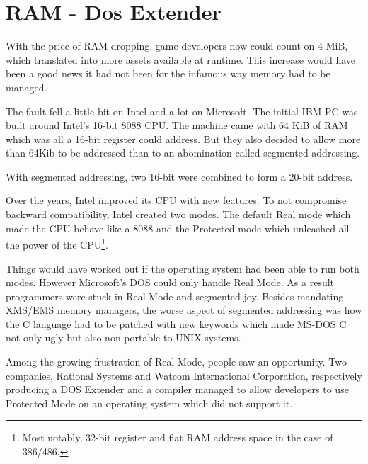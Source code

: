 \section{RAM - Dos Extender}
With the price of RAM dropping, game developers now could count on 4 MiB, which translated into more assets available at runtime. This increase would have been a good news it had not been for the infamous way memory had to be managed.\\
\par
The fault fell a little bit on Intel and a lot on Microsoft. The initial IBM PC was built around Intel's 16-bit 8088 CPU. The machine came with 64 KiB of RAM which was all a 16-bit register could address. But they also decided to allow more than 64Kib to be addressed than to an abomination called segmented addressing.\\
\par
With segmented addressing, two 16-bit were combined to form a 20-bit address.\\
\par


\par
Over the years, Intel improved its CPU with new features. To not compromise backward compatibility, Intel created two modes. The default Real mode which made the CPU behave like a 8088 and the Protected mode which unleashed all the power of the CPU\footnote{Most notably, 32-bit register and flat RAM address space in the case of 386/486.}.\\
\par
Things would have worked out if the operating system had been able to run both modes. However Microsoft's DOS could only handle Real Mode. As a result programmers were stuck in Real-Mode and segmented joy. Besides mandating XMS/EMS memory managers, the worse aspect of segmented addressing was how the C language had to be patched with new keywords which made MS-DOS C not only ugly but also non-portable to UNIX systems.\\
\par
{}
\par
Among the growing frustration of Real Mode, people saw an opportunity. Two companies, Rational Systems and Watcom International Corporation, respectively producing a DOS Extender and a compiler managed to allow developers to use Protected Mode on an operating system which did not support it.\\
\par


